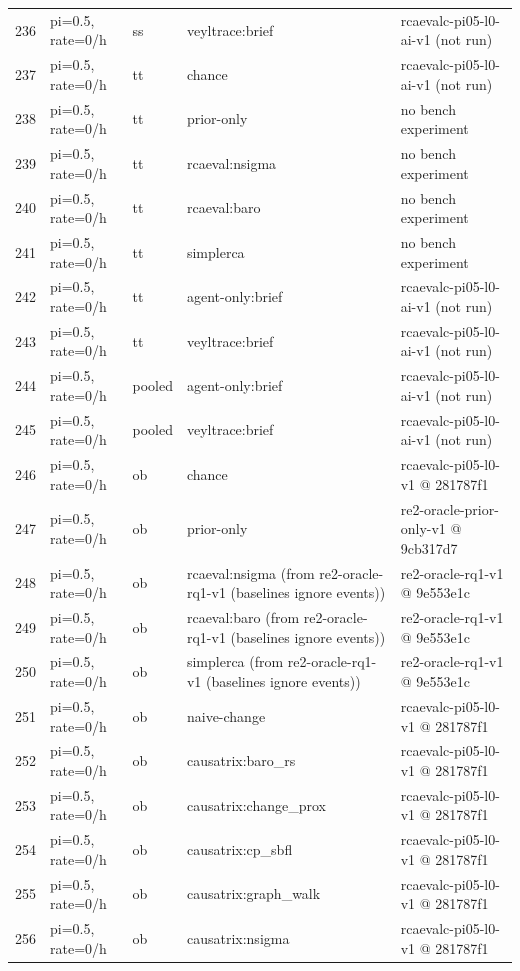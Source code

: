 \begin{longtable}{@{}r>{\raggedright\arraybackslash}p{48.0pt}>{\raggedright\arraybackslash}p{18.0pt}>{\raggedright\arraybackslash}p{108.0pt}>{\raggedright\arraybackslash}p{105.0pt}@{}}
236 & pi=0.5, rate=0/h & ss & veyltrace:brief & rcaevalc-pi05-l0-ai-v1 (not run) \\
237 & pi=0.5, rate=0/h & tt & chance & rcaevalc-pi05-l0-ai-v1 (not run) \\
238 & pi=0.5, rate=0/h & tt & prior-only & no bench experiment \\
239 & pi=0.5, rate=0/h & tt & rcaeval:nsigma & no bench experiment \\
240 & pi=0.5, rate=0/h & tt & rcaeval:baro & no bench experiment \\
241 & pi=0.5, rate=0/h & tt & simplerca & no bench experiment \\
242 & pi=0.5, rate=0/h & tt & agent-only:brief & rcaevalc-pi05-l0-ai-v1 (not run) \\
243 & pi=0.5, rate=0/h & tt & veyltrace:brief & rcaevalc-pi05-l0-ai-v1 (not run) \\
244 & pi=0.5, rate=0/h & pooled & agent-only:brief & rcaevalc-pi05-l0-ai-v1 (not run) \\
245 & pi=0.5, rate=0/h & pooled & veyltrace:brief & rcaevalc-pi05-l0-ai-v1 (not run) \\
246 & pi=0.5, rate=0/h & ob & chance & rcaevalc-pi05-l0-v1 @ 281787f1 \\
247 & pi=0.5, rate=0/h & ob & prior-only & re2-oracle-prior-only-v1 @ 9cb317d7 \\
248 & pi=0.5, rate=0/h & ob & rcaeval:nsigma (from re2-oracle-rq1-v1 (baselines ignore events)) & re2-oracle-rq1-v1 @ 9e553e1c \\
249 & pi=0.5, rate=0/h & ob & rcaeval:baro (from re2-oracle-rq1-v1 (baselines ignore events)) & re2-oracle-rq1-v1 @ 9e553e1c \\
250 & pi=0.5, rate=0/h & ob & simplerca (from re2-oracle-rq1-v1 (baselines ignore events)) & re2-oracle-rq1-v1 @ 9e553e1c \\
251 & pi=0.5, rate=0/h & ob & naive-change & rcaevalc-pi05-l0-v1 @ 281787f1 \\
252 & pi=0.5, rate=0/h & ob & causatrix:baro\_rs & rcaevalc-pi05-l0-v1 @ 281787f1 \\
253 & pi=0.5, rate=0/h & ob & causatrix:change\_prox & rcaevalc-pi05-l0-v1 @ 281787f1 \\
254 & pi=0.5, rate=0/h & ob & causatrix:cp\_sbfl & rcaevalc-pi05-l0-v1 @ 281787f1 \\
255 & pi=0.5, rate=0/h & ob & causatrix:graph\_walk & rcaevalc-pi05-l0-v1 @ 281787f1 \\
256 & pi=0.5, rate=0/h & ob & causatrix:nsigma & rcaevalc-pi05-l0-v1 @ 281787f1 \\

\end{longtable}
